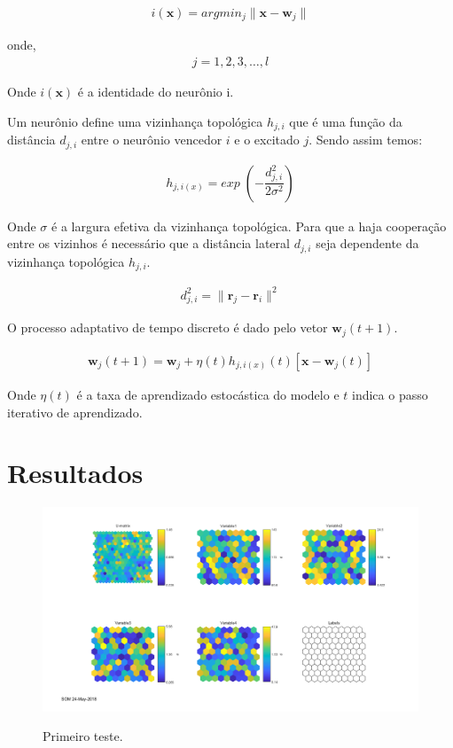 \documentclass[journal, a4paper]{IEEEtran}
\begin{document}
\begin{eqnarray}
	i(\textbf{x})= argmin_{j}  \parallel \textbf{x} - \textbf{w}_{j} \parallel
\end{eqnarray}

onde,
\begin{eqnarray}
j=1,2,3,\hdots,l \nonumber
\end{eqnarray}

Onde $i(\textbf{x})$ é a identidade do neurônio i.

Um neurônio define uma vizinhança topológica $h_{j,i}$ que é uma função da distância $d_{j,i}$ entre o neurônio vencedor $i$ e o excitado $j$. Sendo assim temos:

\begin{eqnarray}
	h_{j,i(x)}=exp \; ( -\dfrac{d^{2}_{j,i}}{2\sigma^{2}} )
\end{eqnarray}

Onde $\sigma$ é a largura efetiva da vizinhança topológica. 
Para que a haja cooperação entre os vizinhos é necessário que a distância lateral $d_{j,i}$ seja dependente da vizinhança topológica $h_{j,i}$.

\begin{eqnarray}
d^{2}_{j,i}= \parallel \textbf{r}_{j}	- \textbf{r}_{i} \parallel^{2}
\end{eqnarray}


O processo adaptativo de tempo discreto é dado pelo vetor $\textbf{w}_{j}(t+1)$.

\begin{eqnarray}
	\textbf{w}_{j}(t+1)= \textbf{w}_{j}+\eta(t)h_{j,i(x)}(t)[\textbf{x}-\textbf{w}_{j}(t)]
\end{eqnarray}

Onde $\eta(t)$ é a taxa de aprendizado estocástica do modelo e $t$ indica o passo iterativo de aprendizado.

\section{Resultados}

\begin{figure}
	\centering
	\includegraphics[scale=0.5]{Images/SOM1.png}
	\label{SOM1}
	\caption{Primeiro teste.}
\end{figure}
\end{document}
